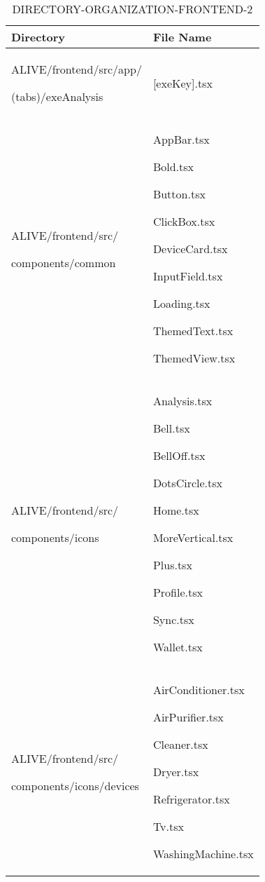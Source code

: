 \documentclass[conference]{IEEEtran}
\begin{document}
\begin{table}[h]
\caption{DIRECTORY-ORGANIZATION-FRONTEND-2}
\def\arraystretch{1.24} \small
    \begin{tabular}{|p{3.7cm}|p{4.1cm}|}
\hline
        Directory & File Name \\ \hline
          ALIVE/frontend/src/app/ \par (tabs)/exeAnalysis & [exeKey].tsx
          \\ \hline
          
          ALIVE/frontend/src/ \par components/common \par  & AppBar.tsx \par Bold.tsx \par Button.tsx \par ClickBox.tsx \par DeviceCard.tsx \par InputField.tsx \par Loading.tsx \par ThemedText.tsx \par ThemedView.tsx
          \\ \hline
          
          ALIVE/frontend/src/ \par components/icons \par  & Analysis.tsx \par Bell.tsx \par BellOff.tsx \par DotsCircle.tsx \par Home.tsx \par MoreVertical.tsx \par Plus.tsx \par Profile.tsx \par Sync.tsx \par Wallet.tsx
          \\ \hline
          
          ALIVE/frontend/src/ \par components/icons/devices \par  & AirConditioner.tsx \par AirPurifier.tsx \par Cleaner.tsx \par Dryer.tsx \par Refrigerator.tsx \par Tv.tsx \par WashingMachine.tsx
          \\ \hline
          

\end{tabular}
\end{table}
\end{document}
